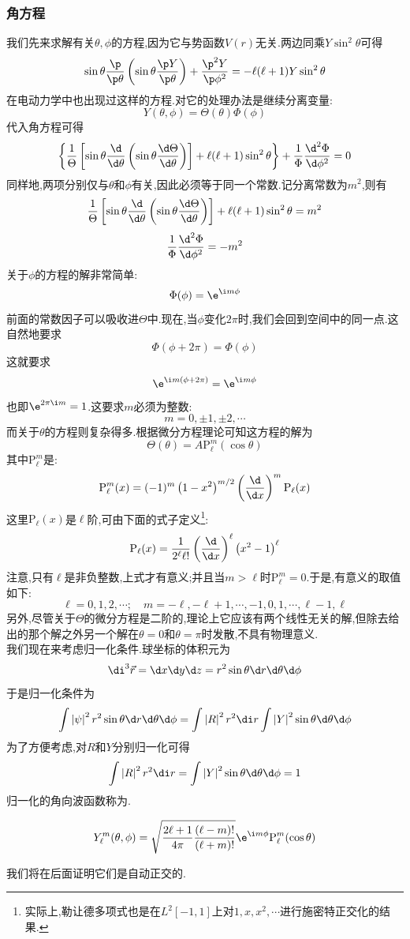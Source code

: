 \documentclass{ctexart}
\begin{document}
\subsubsection{角方程}
我们先来求解有关$\theta,\phi$的方程,因为它与势函数$V(r)$无关.两边同乘$Y\sin^2\theta$可得
\[\sin\theta\dfrac{\p}{\p\theta}\left(\sin\theta\dfrac{\p Y}{\p\theta}\right)+\dfrac{\p^2 Y}{\p\phi^2}=-\ell(\ell+1)Y\sin^2\theta\]
在电动力学中也出现过这样的方程.对它的处理办法是继续分离变量:
\[Y(\theta,\phi)=\Theta(\theta)\Phi(\phi)\]
代入角方程可得
\[\left\{\dfrac{1}{\Theta}\left[\sin\theta\dfrac{\d}{\d\theta}\left(\sin\theta\dfrac{\d\Theta}{\d\theta}\right)\right]+\ell(\ell+1)\sin^2\theta\right\}+\dfrac{1}{\Phi}\dfrac{\d^2\Phi}{\d\phi^2}=0\]
同样地,两项分别仅与$\theta$和$\phi$有关,因此必须等于同一个常数.记分离常数为$m^2$,则有
\[\dfrac{1}{\Theta}\left[\sin\theta\dfrac{\d}{\d\theta}\left(\sin\theta\dfrac{\d\Theta}{\d\theta}\right)\right]+\ell(\ell+1)\sin^2\theta=m^2\]
\[\dfrac{1}{\Phi}\dfrac{\d^2\Phi}{\d\phi^2}=-m^2\]
\indent 关于$\phi$的方程的解非常简单:
\[\Phi(\phi)=\e^{\i m\phi}\]
前面的常数因子可以吸收进$\Theta$中.现在,当$\phi$变化$2\pi$时,我们会回到空间中的同一点.这自然地要求
\[\Phi(\phi+2\pi)=\Phi(\phi)\]
这就要求
\[\e^{\i m(\phi+2\pi)}=\e^{\i m\phi}\]
也即$\e^{2\pi\i m}=1$.这要求$m$必须为整数:
\[m=0,\pm1,\pm2,\cdots\]
\indent 而关于$\theta$的方程则复杂得多.根据微分方程理论可知这方程的解为
\[\Theta(\theta)=A\text{P}_\ell^m(\cos\theta)\]
其中$\text{P}_\ell^m$是:
\[\text{P}_\ell^m(x)=(-1)^m\left(1-x^2\right)^{m/2}\left(\dfrac{\d}{\d x}\right)^m\text{P}_\ell(x)\]
这里$\text{P}_\ell(x)$是$\ell$阶,可由下面的式子定义\footnote{实际上,勒让德多项式也是在$L^2[-1,1]$上对$1,x,x^2,\cdots$进行施密特正交化的结果.}:
\[\text{P}_\ell(x)=\dfrac{1}{2^\ell\ell!}\left(\dfrac{\d}{\d x}\right)^\ell\left(x^2-1\right)^\ell\]
注意,只有$\ell$是非负整数,上式才有意义;并且当$m>\ell$时$\text{P}_\ell^m=0$.于是,有意义的取值如下:
\[\ell=0,1,2,\cdots;\quad m=-\ell,-\ell+1,\cdots,-1,0,1,\cdots,\ell-1,\ell\]
另外,尽管关于$\Theta$的微分方程是二阶的,理论上它应该有两个线性无关的解,但除去给出的那个解之外另一个解在$\theta=0$和$\theta=\pi$时发散,不具有物理意义.\\
\indent 我们现在来考虑归一化条件.球坐标的体积元为
\[\di^3\vec{r}=\d x\d y\d z=r^2\sin\theta\d r\d\theta\d\phi\]
于是归一化条件为
\[\int\left|\psi\right|^2r^2\sin\theta\d r\d\theta\d\phi=\int\left|R\right|^2r^2\di r\int\left|Y\right|^2\sin\theta\d\theta\d\phi\]
为了方便考虑,对$R$和$Y$分别归一化可得
\[\int\left|R\right|^2r^2\di r=\int\left|Y\right|^2\sin\theta\d\theta\d\phi=1\]
归一化的角向波函数称为.
\begin{definition}[球谐函数]
    \[Y_\ell^m(\theta,\phi)=\sqrt{\dfrac{2\ell+1}{4\pi}\dfrac{(\ell-m)!}{(\ell+m)!}}\e^{\i m\phi}\text{P}_\ell^m(\cos\theta)\]
\end{definition}
我们将在后面证明它们是自动正交的.
\end{document}
